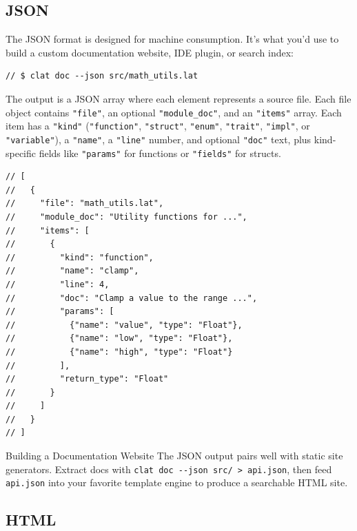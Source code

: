 \subsection{JSON}\label{sec:doc-json}

The JSON format is designed for machine consumption.
It's what you'd use to build a custom documentation website, IDE plugin, or search index:

\begin{lstlisting}[language=Lattice, caption={Generating JSON output}]
// $ clat doc --json src/math_utils.lat
\end{lstlisting}

The output is a JSON array where each element represents a source file.
Each file object contains \lstinline|"file"|, an optional \lstinline|"module_doc"|, and an \lstinline|"items"| array.
Each item has a \lstinline|"kind"| (\lstinline|"function"|, \lstinline|"struct"|, \lstinline|"enum"|, \lstinline|"trait"|, \lstinline|"impl"|, or \lstinline|"variable"|), a \lstinline|"name"|, a \lstinline|"line"| number, and optional \lstinline|"doc"| text, plus kind-specific fields like \lstinline|"params"| for functions or \lstinline|"fields"| for structs.

\begin{lstlisting}[language=Lattice, caption={Example JSON output (abbreviated)}]
// [
//   {
//     "file": "math_utils.lat",
//     "module_doc": "Utility functions for ...",
//     "items": [
//       {
//         "kind": "function",
//         "name": "clamp",
//         "line": 4,
//         "doc": "Clamp a value to the range ...",
//         "params": [
//           {"name": "value", "type": "Float"},
//           {"name": "low", "type": "Float"},
//           {"name": "high", "type": "Float"}
//         ],
//         "return_type": "Float"
//       }
//     ]
//   }
// ]
\end{lstlisting}

\begin{tipbox}{Building a Documentation Website}
The JSON output pairs well with static site generators.
Extract docs with \lstinline|clat doc --json src/ > api.json|, then feed \lstinline|api.json| into your favorite template engine to produce a searchable HTML site.
\end{tipbox}

\subsection{HTML}\label{sec:doc-html}

